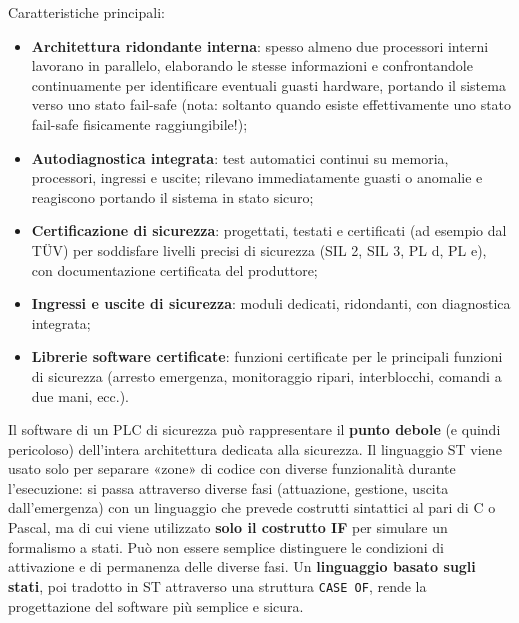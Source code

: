 Caratteristiche principali:
\begin{itemize}
    \item \textbf{Architettura ridondante interna}: spesso almeno due processori interni lavorano in parallelo, elaborando le stesse informazioni e confrontandole continuamente per identificare eventuali guasti hardware, portando il sistema verso uno stato fail-safe (nota: soltanto quando esiste effettivamente uno stato fail-safe fisicamente raggiungibile!);
    \item \textbf{Autodiagnostica integrata}: test automatici continui su memoria, processori, ingressi e uscite; rilevano immediatamente guasti o anomalie e reagiscono portando il sistema in stato sicuro;
    \item \textbf{Certificazione di sicurezza}: progettati, testati e certificati (ad esempio dal TÜV) per soddisfare livelli precisi di sicurezza (SIL 2, SIL 3, PL d, PL e), con documentazione certificata del produttore;
    \item \textbf{Ingressi e uscite di sicurezza}: moduli dedicati, ridondanti, con diagnostica integrata;
    \item \textbf{Librerie software certificate}: funzioni certificate per le principali funzioni di sicurezza (arresto emergenza, monitoraggio ripari, interblocchi, comandi a due mani, ecc.).
\end{itemize}

\begin{note}
Il software di un PLC di sicurezza può rappresentare il \textbf{punto debole} (e quindi pericoloso) dell'intera architettura dedicata alla sicurezza. Il linguaggio ST viene usato solo per separare «zone» di codice con diverse funzionalità durante l'esecuzione: si passa attraverso diverse fasi (attuazione, gestione, uscita dall'emergenza) con un linguaggio che prevede costrutti sintattici al pari di C o Pascal, ma di cui viene utilizzato \textbf{solo il costrutto IF} per simulare un formalismo a stati. Può non essere semplice distinguere le condizioni di attivazione e di permanenza delle diverse fasi. Un \textbf{linguaggio basato sugli stati}, poi tradotto in ST attraverso una struttura \texttt{CASE OF}, rende la progettazione del software più semplice e sicura.
\end{note}

